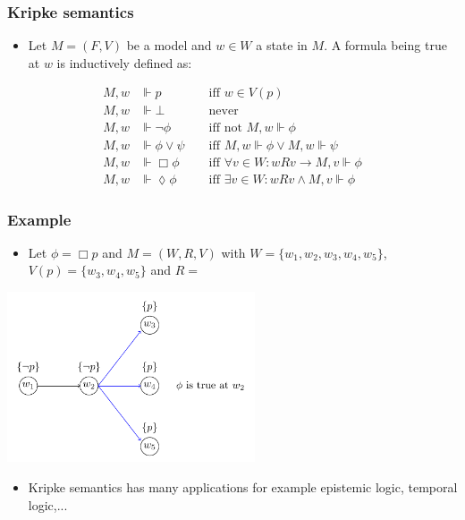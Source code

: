 \documentclass[hyperref={pdfpagelabels=false},t,10pt]{beamer}
\begin{document}
\begin{frame}
  \frametitle{Kripke semantics}
  \begin{itemize}
    \item Let $M = (F,V)$ be a model and $w \in W$ a state in $M$. A formula being true at $w$ is inductively defined as: 
  \end{itemize}

  \begin{align*}
    M, w &\Vdash p &&\text{ iff } w \in V(p) \\
    M, w &\Vdash \bot  &&\text{ never } \\
    M, w &\Vdash \neg \phi &&\text{ iff not } M, w \Vdash \phi \\ 
    M, w &\Vdash \phi \lor \psi &&\text{ iff } M,w \Vdash \phi \lor M,w \Vdash \psi \\
    M, w &\Vdash \Box \phi &&\text{ iff } \forall v \in W : wRv \rightarrow M, v \Vdash \phi \\
    M, w &\Vdash \lozenge \phi &&\text{ iff } \exists v \in W : wRv \land M,v \Vdash \phi
\end{align*}
  
\end{frame}

\begin{frame}
  \frametitle{Example}
  \begin{itemize}
    \item Let $\phi = \Box p$ and $M = (W,R,V)$ with $W = \{w_1,w_2,w_3,w_4,w_5\}$, $V(p) = \{w_3,w_4,w_5\}$ and $R = $
  \end{itemize}
  \centering
  \includegraphics[width=0.55\textwidth]{Example1.pdf}
  \pause
  \begin{itemize}
    \item Kripke semantics has many applications for example epistemic logic, temporal logic,...
  \end{itemize}
\end{frame}
\end{document}
